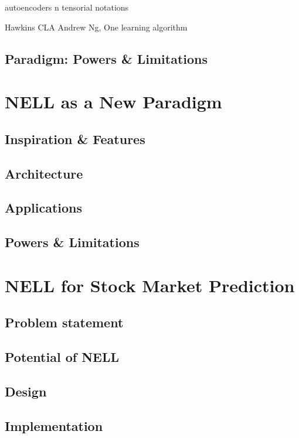 \documentclass[12pt]{article}  %
\begin{document}
autoencoders n tensorial notations


Hawkins
CLA
Andrew Ng, One learning algorithm





\subsection{Paradigm: Powers \& Limitations}



\section{NELL as a New Paradigm}

\subsection{Inspiration \& Features}
\subsection{Architecture}
\subsection{Applications}
\subsection{Powers \& Limitations}



\section{NELL for Stock Market Prediction}

\subsection{Problem statement}
\subsection{Potential of NELL}
\subsection{Design}
\subsection{Implementation}
\end{document}
